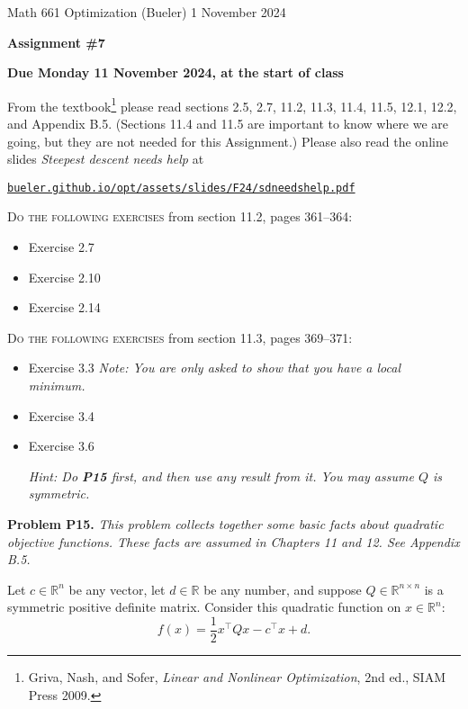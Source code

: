 \documentclass[12pt]{amsart}
\newcommand{\RR}{\mathbb{R}}
\newcommand{\prob}[1]{\bigskip\noindent\textbf{#1}\quad }
\begin{document}
\scriptsize \noindent Math 661 Optimization (Bueler) \hfill 1 November 2024
\normalsize

\medskip\bigskip

\Large\centerline{\textbf{Assignment \#7}}
\large
\bigskip

\centerline{\textbf{Due Monday 11 November 2024, at the start of class}}
\bigskip
\normalsize

\thispagestyle{empty}

\bigskip
\noindent From the textbook\footnote{Griva, Nash, and Sofer, \emph{Linear and Nonlinear Optimization}, 2nd ed., SIAM Press 2009.} please read sections 2.5, 2.7, 11.2, 11.3, 11.4, 11.5, 12.1, 12.2, and Appendix B.5.  (Sections 11.4 and 11.5 are important to know where we are going, but they are not needed for this Assignment.)  Please also read the online slides \emph{Steepest descent needs help} at

  \centerline{\href{https://bueler.github.io/opt/assets/slides/F24/sdneedshelp.pdf}{\texttt{bueler.github.io/opt/assets/slides/F24/sdneedshelp.pdf}}}

\bigskip
\noindent \textsc{Do the following exercises} from section 11.2, pages 361--364:

\begin{itemize}
\item Exercise 2.7
\item Exercise 2.10
\item Exercise 2.14
\end{itemize}

\bigskip
\noindent \textsc{Do the following exercises} from section 11.3, pages 369--371:

\begin{itemize}
\item Exercise 3.3 \quad \emph{Note: You are only asked to show that you have a \emph{local} minimum.}
\item Exercise 3.4
\item Exercise 3.6 \quad \begin{minipage}[t]{0.7\textwidth} \emph{Hint: Do \emph{\textbf{P15}} first, and then use any result from it.  You may assume $Q$ is symmetric.}\end{minipage}
\end{itemize}


\prob{Problem P15.}  \emph{This problem collects together some basic facts about quadratic objective functions.  These facts are assumed in Chapters 11 and 12.  See Appendix B.5.}

\medskip \noindent Let $c\in\RR^n$ be any vector, let $d\in\RR$ be any number, and suppose $Q\in \RR^{n\times n}$ is a symmetric positive definite matrix.  Consider this quadratic function on $x\in\RR^n$:
\begin{equation*}
    f(x) = \frac{1}{2} x^\top Q x - c^\top x + d.   \label{quad}
\end{equation*}
\end{document}
